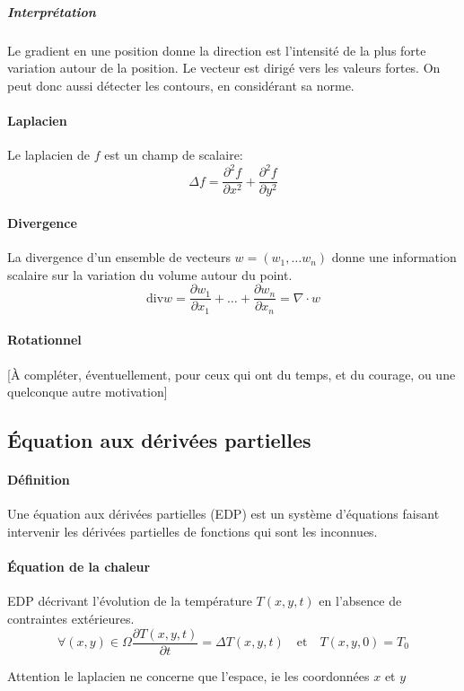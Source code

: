 \documentclass[french]{article}
\begin{document}
\subparagraph{Interprétation} Le gradient en une position donne la direction
est l'intensité de la plus forte variation autour de la position. Le
vecteur est dirigé vers les valeurs fortes. On peut donc aussi détecter
les contours, en considérant sa norme.

\paragraph{Laplacien} Le laplacien de $f$ est un champ de scalaire:
$$\Delta f = \frac{\partial^2 f}{\partial x^2} + \frac{\partial^2 f}{\partial y^2}$$

\paragraph{Divergence} La divergence d'un ensemble de vecteurs
$w = (w_1, \dots w_n)$ donne une information scalaire sur la variation
du volume autour du point.
$$\text{div} w = \frac{\partial w_1}{\partial x_1} + \dots + \frac{\partial w_n}{\partial x_n} = \nabla \cdot w$$

\paragraph{Rotationnel} [À compléter, éventuellement,
pour ceux qui ont du temps, et du courage, ou une quelconque autre motivation]

\subsection{Équation aux dérivées partielles}
\paragraph{Définition} Une équation aux dérivées partielles (EDP) est un
système d'équations faisant intervenir les dérivées partielles de fonctions
qui sont les inconnues.

\paragraph{Équation de la chaleur} EDP décrivant l'évolution de la
température $T(x,y,t)$ en l'absence de contraintes extérieures.
$$\forall (x,y) \in \Omega \frac{\partial T(x,y,t)}{\partial t} = \Delta T(x,y,t)
\quad\text{et}\quad T(x,y,0) = T_0$$

Attention le laplacien ne concerne que l'espace, ie les coordonnées $x$ et $y$
\end{document}
